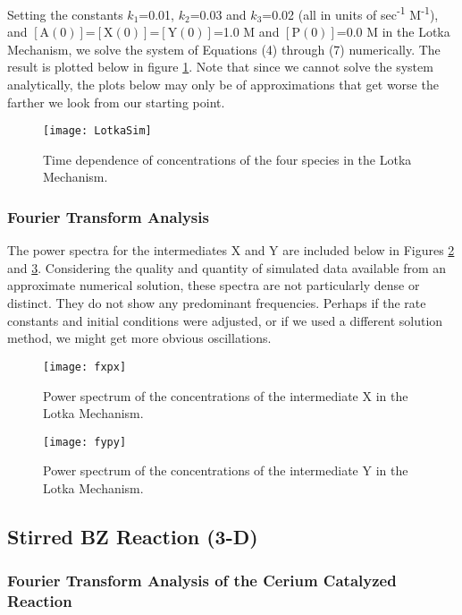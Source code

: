 \documentclass{article}
\begin{document}
Setting the constants $k_1$=0.01, $k_2$=0.03 and $k_3$=0.02 (all in units of
sec\textsuperscript{-1} M\textsuperscript{-1}), and
$[\mathrm{A}(0)]$=$[\mathrm{X}(0)]$=$[\mathrm{Y}(0)]$=1.0 M
and $[\mathrm{P}(0)]$=0.0 M in the
Lotka Mechanism, we solve the system of Equations (4) through (7) numerically. The result
is plotted below in figure \ref{losim}. Note that since we cannot solve the system analytically,
the plots below may only be of approximations that get worse the farther we look from our 
starting point.

\begin{figure}[H]
\texttt{[image: LotkaSim]}
\centering
\caption{Time dependence of concentrations of the four species in the Lotka Mechanism.}
\label{losim}
\end{figure}

\subsubsection{Fourier Transform Analysis}

The power spectra for the intermediates X and Y are included below in Figures \ref{frlx} and 
\ref{frly}. Considering the quality and quantity of simulated data available from an 
approximate numerical solution, these spectra are not particularly dense or distinct. They do
not show any predominant frequencies. Perhaps if the rate constants and initial conditions
were adjusted, or if we used a different solution method, we might get more obvious 
oscillations.

\begin{figure}[H]
\texttt{[image: fxpx]}
\centering
\caption{Power spectrum of the concentrations of the intermediate X in the Lotka 
Mechanism.}
\label{frlx}
\end{figure}

\begin{figure}[H]
\texttt{[image: fypy]}
\centering
\caption{Power spectrum of the concentrations of the intermediate Y in the Lotka 
Mechanism.}\label{frly}
\end{figure}

\subsection{Stirred BZ Reaction (3-D)}

\subsubsection{Fourier Transform Analysis of the Cerium Catalyzed Reaction}
\end{document}
